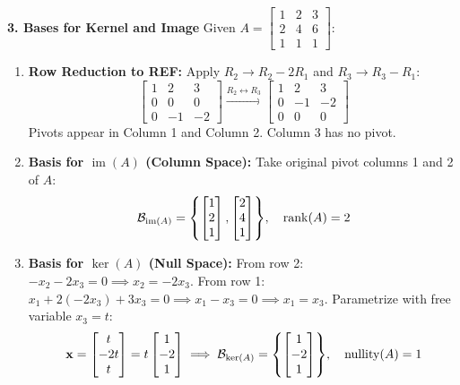 \textbf{3. Bases for Kernel and Image}
Given $A = \begin{bmatrix} 1 & 2 & 3 \\ 2 & 4 & 6 \\ 1 & 1 & 1 \end{bmatrix}$:
\begin{enumerate}
    \item \textbf{Row Reduction to REF:}
    Apply $R_2 \to R_2 - 2R_1$ and $R_3 \to R_3 - R_1$:
    \begin{equation*}
    \begin{bmatrix} 1 & 2 & 3 \\ 0 & 0 & 0 \\ 0 & -1 & -2 \end{bmatrix} \xrightarrow{R_2 \leftrightarrow R_3} \begin{bmatrix} 1 & 2 & 3 \\ 0 & -1 & -2 \\ 0 & 0 & 0 \end{bmatrix}
    \end{equation*}
    Pivots appear in Column 1 and Column 2. Column 3 has no pivot.
    \item \textbf{Basis for $\operatorname{im}(A)$ (Column Space):}
    Take original pivot columns 1 and 2 of $A$:
    \begin{equation*}
    \mathcal{B}_{\operatorname{im}(A)} = \mathbf{\left\{ \begin{bmatrix} 1 \\ 2 \\ 1 \end{bmatrix}, \begin{bmatrix} 2 \\ 4 \\ 1 \end{bmatrix} \right\}}, \quad \operatorname{rank}(A) = 2
    \end{equation*}
    \item \textbf{Basis for $\ker(A)$ (Null Space):}
    From row 2: $-x_2 - 2x_3 = 0 \implies x_2 = -2x_3$.
    From row 1: $x_1 + 2(-2x_3) + 3x_3 = 0 \implies x_1 - x_3 = 0 \implies x_1 = x_3$.
    Parametrize with free variable $x_3 = t$:
    \begin{equation*}
    \mathbf{x} = \begin{bmatrix} t \\ -2t \\ t \end{bmatrix} = t \begin{bmatrix} 1 \\ -2 \\ 1 \end{bmatrix} \implies \mathcal{B}_{\ker(A)} = \mathbf{\left\{ \begin{bmatrix} 1 \\ -2 \\ 1 \end{bmatrix} \right\}}, \quad \operatorname{nullity}(A) = 1
    \end{equation*}
\end{enumerate}

